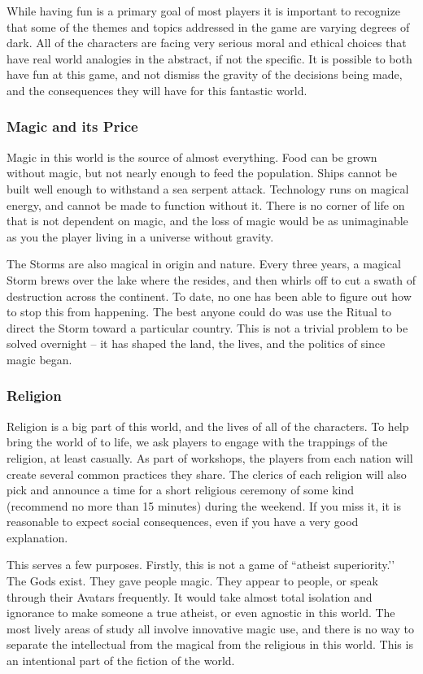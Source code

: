 \documentclass[sheet]{GL2020}
\begin{document}
While having fun is a primary goal of most players it is important to recognize that some of the themes and topics addressed in the game are varying degrees of dark. All of the characters are facing very serious moral and ethical choices that have real world analogies in the abstract, if not the specific. It is possible to both have fun at this game, and not dismiss the gravity of the decisions being made, and the consequences they will have for this fantastic world.

\subsubsection{Magic and its Price}
Magic in this world is the source of almost everything. Food can be grown without magic, but not nearly enough to feed the population. Ships cannot be built well enough to withstand a sea serpent attack. Technology runs on magical energy, and cannot be made to function without it. There is no corner of life on \pEarth{} that is not dependent on magic, and the loss of magic would be as unimaginable as you the player living in a universe without gravity.

The Storms are also magical in origin and nature. Every three years, a magical Storm brews over the lake where the \pSc{} resides, and then whirls off to cut a swath of destruction across the continent. To date, no one has been able to figure out how to stop this from happening. The best anyone could do was use the Ritual to direct the Storm toward a particular country. This is not a trivial problem to be solved overnight -- it has shaped the land, the lives, and the politics of \pEarth{} since magic began.

\subsubsection{Religion}
Religion is a big part of this world, and the lives of all of the characters. To help bring the world of \pEarth{} to life, we ask players to engage with the trappings of the religion, at least casually. As part of workshops, the players from each nation will create several common practices they share. The clerics of each religion will also pick and announce a time for a short religious ceremony of some kind (recommend no more than 15 minutes) during the weekend. If you miss it, it is reasonable to expect social consequences, even if you have a very good explanation.

This serves a few purposes. Firstly, this is not a game of ``atheist superiority.’’ The Gods exist. They gave people magic. They appear to people, or speak through their Avatars frequently. It would take almost total isolation and ignorance to make someone a true atheist, or even agnostic in this world. The most lively areas of study all involve innovative magic use, and there is no way to separate the intellectual from the magical from the religious in this world. This is an intentional part of the fiction of the world. 
\end{document}
